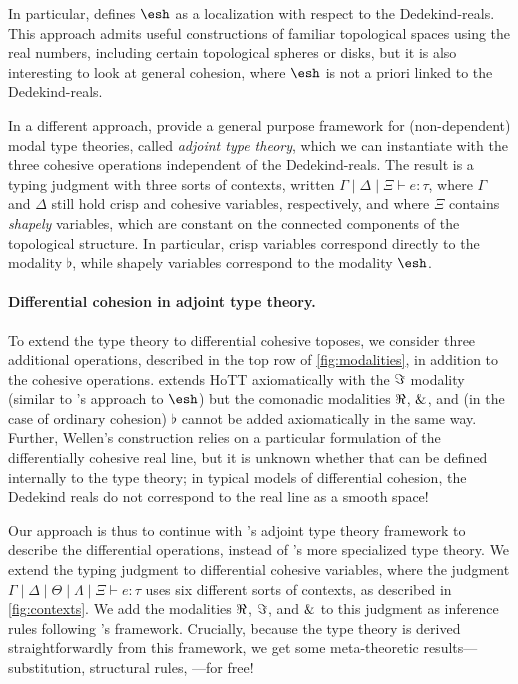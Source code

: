\documentclass{article}
\begin{document}
In particular, \citeauthor{Shulman2015} defines $\shape$ as a localization with
respect to the Dedekind-reals. This approach admits useful constructions of
familiar topological spaces using the real numbers, including certain
topological spheres or disks, but it is also interesting to look at general
cohesion, where $\shape$ is not a priori linked to the Dedekind-reals. 

In a different approach, \citet{Licata2017} provide a general purpose
framework for (non-dependent) modal type theories, called \emph{adjoint type
  theory}, which we can instantiate with the three cohesive operations
independent of the Dedekind-reals. The result is a typing judgment with three
sorts of contexts, written $\Gamma \mid \Delta \mid \Xi \vdash e : \tau$, where
$\Gamma$ and $\Delta$ still hold crisp and cohesive variables, respectively, and
where $\Xi$ contains \emph{shapely} variables, which are constant on the
connected components of the topological structure. In particular, crisp
variables correspond directly to the modality $\flat$, while shapely variables
correspond to the modality $\shape$.


\paragraph{Differential cohesion in adjoint type theory.}

To extend the type theory to differential cohesive toposes, we consider three
additional operations, described in the top row of \cref{fig:modalities}, in
addition to the cohesive operations. \citet{Wellen2017} extends HoTT
axiomatically with the $\Im$ modality (similar to \citeauthor{Shulman2015}'s
approach to $\shape$) but the comonadic modalities $\Re$, $\&$, and (in the
case of ordinary cohesion) $\flat$ cannot be added axiomatically in the same
way. Further, Wellen's construction relies on a particular formulation of the
differentially cohesive real line, but it is unknown whether that can be defined
internally to the type theory; in typical models of differential cohesion, the
Dedekind reals do not correspond to the real line as a smooth space!

Our approach is thus to continue with \citet{Licata2017}'s adjoint type theory
framework to describe the differential operations, instead of
\citet{Shulman2015}'s more specialized type theory. We extend the typing
judgment to differential cohesive variables, where the judgment
$\Gamma \mid \Delta \mid \Theta \mid \Lambda \mid \Xi \vdash e : \tau$ uses six
different sorts of contexts, as described in \cref{fig:contexts}. We add the
modalities $\Re$, $\Im$, and $\&$ to this judgment as inference rules
following \citeauthor{Licata2017}'s framework. Crucially, because the type
theory is derived straightforwardly from this framework, we get some
meta-theoretic results---substitution, structural rules, \etc---for free!
\end{document}

